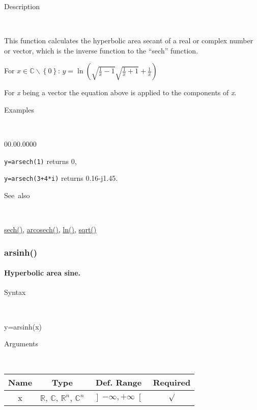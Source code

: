 \begin{description}
\item [Description]~
\end{description}
This function calculates the hyperbolic area secant of a real or complex
number or vector, which is the inverse function to the {}``sech''
function.

\medskip{}
For $x\in\mathbb{C}\backslash \left\lbrace 0\right\rbrace $: $y=\ln\left(\sqrt{\frac{1}{x}-1}\sqrt{\frac{1}{x}+1}+\frac{1}{x}\right)$
\medskip{}

For \textit{x} being a vector the equation above is applied
to the components of \textit{x}.

\begin{description}
\item [Examples]~
\end{description}
\begin{lyxlist}{00.00.0000}
\item [\texttt{y=arsech(1)}]returns 0,
\item [\texttt{y=arsech(3+4{*}i)}]returns 0.16-j1.45.
\end{lyxlist}
\begin{description}
\item [See~also]~
\end{description}
\textcolor{blue}{\hyperlink{sech}{sech()}}\textcolor{black}{,} \textcolor{blue}{\hyperlink{arcosech}{arcosech()}}\textcolor{black}{,} 
\textcolor{blue}{\hyperlink{ln}{ln()}}\textcolor{black}{,} \textcolor{blue}{\hyperlink{sqrt}{sqrt()}}


\newpage
\subsubsection*{\hypertarget{arsinh}{}{\Large arsinh()}}


\paragraph{\label{par:Hyperbolic-area-sine}Hyperbolic area sine.}

\begin{description}
\item [Syntax]~
\end{description}
y=arsinh(x)

\begin{description}
\item [Arguments]~
\end{description}
\begin{tabular}{|c|c|c|c|}
\hline 
Name&
Type&
Def. Range&
Required\tabularnewline
\hline
\hline 
x&
$\mathbb{R}$, $\mathbb{C}$, $\mathbb{R}^{n}$, $\mathbb{C}^{n}$&
$\left]-\infty,+\infty\right[$&
$\surd$\tabularnewline
\hline
\end{tabular}

